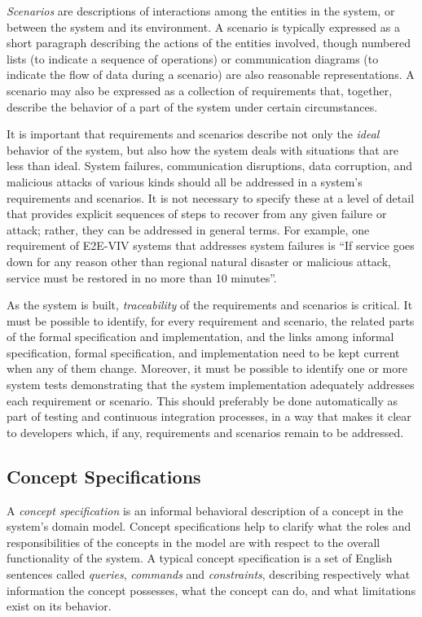 \emph{Scenarios} are descriptions of interactions among the entities
in the system, or between the system and its environment. A scenario
is typically expressed as a short paragraph describing the actions of
the entities involved, though numbered lists (to indicate a sequence
of operations) or communication diagrams (to indicate the flow of data
during a scenario) are also reasonable representations. A scenario may
also be expressed as a collection of requirements that, together,
describe the behavior of a part of the system under certain
circumstances.

It is important that requirements and scenarios describe not only the
\emph{ideal} behavior of the system, but also how the system deals
with situations that are less than ideal. System failures,
communication disruptions, data corruption, and malicious attacks of
various kinds should all be addressed in a system's requirements and
scenarios. It is not necessary to specify these at a level of detail
that provides explicit sequences of steps to recover from any given
failure or attack; rather, they can be addressed in general terms. For
example, one requirement of E2E-VIV systems that addresses system
failures is ``If service goes down for any reason other than regional
natural disaster or malicious attack, service must be restored in no
more than 10 minutes''.

As the system is built, \emph{traceability} of the requirements and
scenarios is critical. It must be possible to identify, for every
requirement and scenario, the related parts of the formal
specification and implementation, and the links among informal
specification, formal specification, and implementation need to be
kept current when any of them change. Moreover, it must be possible to
identify one or more system tests demonstrating that the system
implementation adequately addresses each requirement or scenario. This
should preferably be done automatically as part of testing and
continuous integration processes, in a way that makes it clear to
developers which, if any, requirements and scenarios remain to be
addressed.

\subsection{Concept Specifications}

A \emph{concept specification} is an informal behavioral description
of a concept in the system's domain model. Concept specifications help
to clarify what the roles and responsibilities of the concepts in the
model are with respect to the overall functionality of the system. A
typical concept specification is a set of English sentences called
\emph{queries}, \emph{commands} and \emph{constraints}, describing
respectively what information the concept possesses, what the concept
can do, and what limitations exist on its behavior. 

